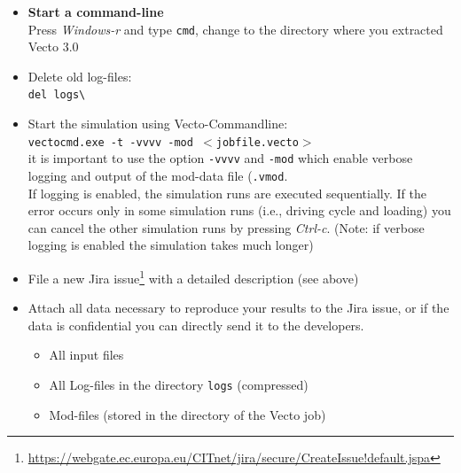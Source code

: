\begin{itemize}
	\item \textbf{Start a command-line}\\
		Press \textit{Windows-r} and type \texttt{cmd}, change to the directory where you extracted Vecto 3.0
	\item Delete old log-files:\\
		\texttt{del logs\textbackslash*}
	\item Start the simulation using Vecto-Commandline: \\
		\texttt{vectocmd.exe -t -vvvv -mod $<$jobfile.vecto$>$} \\
		it is important to use  the option \texttt{-vvvv} and \texttt{-mod} which enable verbose logging and output of the mod-data file (\texttt{.vmod}. \\[0.5em]
		If logging is enabled, the simulation runs are executed sequentially. If the error occurs only in some simulation runs (i.e., driving cycle and loading) you can cancel the other simulation runs by pressing \textit{Ctrl-c}. (Note: if verbose logging is enabled the simulation takes much longer)
	\item File a new Jira issue\footnote{\url{https://webgate.ec.europa.eu/CITnet/jira/secure/CreateIssue!default.jspa}} with a detailed description (see above)
	\item Attach all data necessary to reproduce your results to the Jira issue, or if the data is confidential you can directly send it to the developers.
	\begin{itemize}
		\item All input files
		\item All Log-files in the directory \texttt{logs} (compressed)
		\item Mod-files (stored in the directory of the Vecto job)
	\end{itemize}
\end{itemize}




